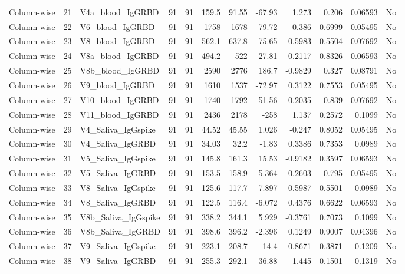 \begin{longtable}{lrp{}rrrrrrrrl}
Column-wise & 21 & V4a\_blood\_IgGRBD & 91 & 91 & 159.5 & 91.55 & -67.93 & 1.273 & 0.206 & 0.06593 & No \\
Column-wise & 22 & V6\_blood\_IgGRBD & 91 & 91 & 1758 & 1678 & -79.72 & 0.386 & 0.6999 & 0.05495 & No \\
Column-wise & 23 & V8\_blood\_IgGRBD & 91 & 91 & 562.1 & 637.8 & 75.65 & -0.5983 & 0.5504 & 0.07692 & No \\
Column-wise & 24 & V8a\_blood\_IgGRBD & 91 & 91 & 494.2 & 522 & 27.81 & -0.2117 & 0.8326 & 0.06593 & No \\
Column-wise & 25 & V8b\_blood\_IgGRBD & 91 & 91 & 2590 & 2776 & 186.7 & -0.9829 & 0.327 & 0.08791 & No \\
Column-wise & 26 & V9\_blood\_IgGRBD & 91 & 91 & 1610 & 1537 & -72.97 & 0.3122 & 0.7553 & 0.05495 & No \\
Column-wise & 27 & V10\_blood\_IgGRBD & 91 & 91 & 1740 & 1792 & 51.56 & -0.2035 & 0.839 & 0.07692 & No \\
Column-wise & 28 & V11\_blood\_IgGRBD & 91 & 91 & 2436 & 2178 & -258 & 1.137 & 0.2572 & 0.1099 & No \\
Column-wise & 29 & V4\_Saliva\_IgGspike & 91 & 91 & 44.52 & 45.55 & 1.026 & -0.247 & 0.8052 & 0.05495 & No \\
Column-wise & 30 & V4\_Saliva\_IgGRBD & 91 & 91 & 34.03 & 32.2 & -1.83 & 0.3386 & 0.7353 & 0.0989 & No \\
Column-wise & 31 & V5\_Saliva\_IgGspike & 91 & 91 & 145.8 & 161.3 & 15.53 & -0.9182 & 0.3597 & 0.06593 & No \\
Column-wise & 32 & V5\_Saliva\_IgGRBD & 91 & 91 & 153.5 & 158.9 & 5.364 & -0.2603 & 0.795 & 0.05495 & No \\
Column-wise & 33 & V8\_Saliva\_IgGspike & 91 & 91 & 125.6 & 117.7 & -7.897 & 0.5987 & 0.5501 & 0.0989 & No \\
Column-wise & 34 & V8\_Saliva\_IgGRBD & 91 & 91 & 122.5 & 116.4 & -6.072 & 0.4376 & 0.6622 & 0.06593 & No \\
Column-wise & 35 & V8b\_Saliva\_IgGspike & 91 & 91 & 338.2 & 344.1 & 5.929 & -0.3761 & 0.7073 & 0.1099 & No \\
Column-wise & 36 & V8b\_Saliva\_IgGRBD & 91 & 91 & 398.6 & 396.2 & -2.396 & 0.1249 & 0.9007 & 0.04396 & No \\
Column-wise & 37 & V9\_Saliva\_IgGspike & 91 & 91 & 223.1 & 208.7 & -14.4 & 0.8671 & 0.3871 & 0.1209 & No \\
Column-wise & 38 & V9\_Saliva\_IgGRBD & 91 & 91 & 255.3 & 292.1 & 36.88 & -1.445 & 0.1501 & 0.1319 & No \\

\end{longtable}
